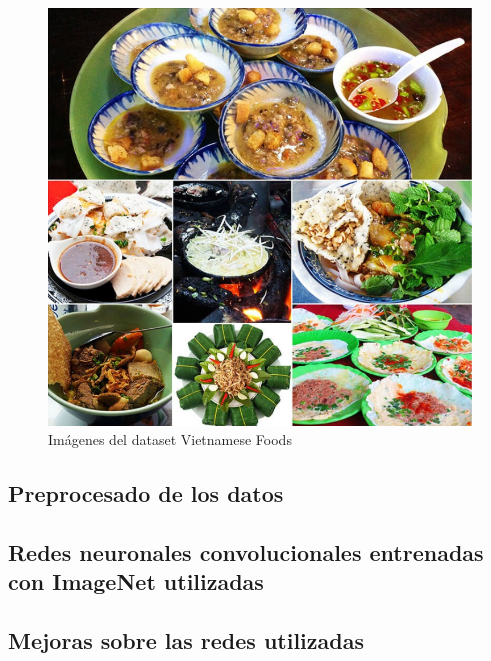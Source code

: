 \begin{figure}[H]
  \centering
  \includegraphics[width=0.5\linewidth]{Imagenes/comida-vietnamita.png}
  \caption{Imágenes del dataset Vietnamese Foods}
  \label{fig:sub-first}
\end{figure}

\newpage

\subsection{Preprocesado de los datos}


\subsection{Redes neuronales convolucionales entrenadas con ImageNet utilizadas}

\vspace{5 mm}



\subsection{Mejoras sobre las redes utilizadas}
